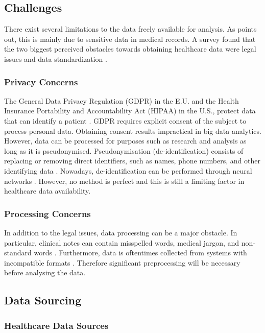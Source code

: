\documentclass[a4paper,12pt]{article}
\begin{document}
\subsection{Challenges}

There exist several limitations to the data freely available for analysis.
As \textcite[2]{Dalianis2015} points out, this is mainly due to sensitive data
in medical records.
A survey found that the two biggest perceived obstacles towards obtaining
healthcare data were legal issues and data standardization \parencite{Kim2019}.

\subsubsection{Privacy Concerns}

The General Data Privacy Regulation (GDPR) in the E.U. and the Health Insurance
Portability and Accountability Act (HIPAA) in the U.S., protect data that can
identify a patient \parencite{Iyengar2018}.
GDPR requires explicit consent of the subject to process personal data.
Obtaining consent results impractical in big data analytics.
However, data can be processed for purposes such as research and analysis as
long as it is pseudonymised.
Pseudonymisation (de-identification) consists of replacing or removing direct
identifiers, such as names, phone numbers, and other identifying data \parencite{Hintze2018}.
Nowadays, de-identification can be performed through neural networks \parencite{Dernoncourt2016}.
However, no method is perfect and this is still a limiting factor in healthcare data availability.

\subsubsection{Processing Concerns}

In addition to the legal issues, data processing can be a major obstacle.
In particular, clinical notes can contain misspelled words, medical jargon,
and non-standard words \parencite{Dalianis2015}.
Furthermore, data is oftentimes collected from systems with incompatible formats
\parencite[34]{Consoli2019}.
Therefore significant preprocessing will be necessary before analysing the data.

\subsection{Data Sourcing}

\subsubsection{Healthcare Data Sources}
\end{document}
